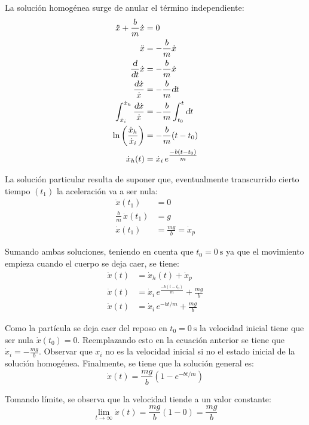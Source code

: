 \documentclass[a5paper,12pt,twoside]{book}
\begin{document}
La solución homogénea surge de anular el término independiente:
\begin{align*}
    \ddot{x} + \frac{b}{m} \dot{x} &= 0
    \\
    \ddot{x} &= - \frac{b}{m} \dot{x}
    \\
    \frac{\textsl{d}}{\textsl{d} t} \dot{x} &= - \frac{b}{m} \dot{x}
    \\
    \frac{\textsl{d} \dot{x}}{\dot{x}} &= - \frac{b}{m} \textsl{d} t
    \\
    \int_{\dot{x}_i}^{\dot{x}_h} \frac{\textsl{d} \dot{x}}{\dot{x}} &= - \frac{b}{m} \int_{t_0}^t \textsl{d} t
    \\
    \ln{ \left( \frac{\dot{x}_h}{\dot{x}_i} \right) } &= - \frac{b}{m} (t-t_0)
    \\
    \dot{x}_h(t) &= \dot{x}_i \, e^ {\tfrac{-b(t-t_0)}{m}}
\end{align*}

La solución particular resulta de suponer que, eventualmente transcurrido cierto tiempo $(t_1)$ la aceleración va a ser nula:
\begin{align*}
    \ddot{x}(t_1) &= 0
    \\
    \frac{b}{m} \, \dot{x}(t_1) &= g
    \\
    \dot{x}(t_1) &= \frac{mg}{b} = \dot{x}_p
\end{align*}

Sumando ambas soluciones, teniendo en cuenta que $t_0 = \SI{0}{\second}$ ya que el movimiento empieza cuando el cuerpo se deja caer, se tiene:
\begin{align*}
    \dot{x}(t) &= \dot{x}_h(t) + \dot{x}_p
    \\
    \dot{x}(t) &= \dot{x}_i \, e^ {\tfrac{-b(t-t_0)}{m}} + \frac{mg}{b}
    \\
    \dot{x}(t) &= \dot{x}_i \, e^ {-bt/m} + \frac{mg}{b}
\end{align*}

Como la partícula se deja caer del reposo en $t_0 = \SI{0}{\second}$ la velocidad inicial tiene que ser nula $\dot{x}(t_0) = 0$.
Reemplazando esto en la ecuación anterior se tiene que $\dot{x}_i = -\frac{mg}{b}$.
Observar que $x_i$ no es la velocidad inicial si no el estado inicial de la solución homogénea.
Finalmente, se tiene que la solución general es:
\[ \dot{x}(t) = \frac{mg}{b} \left( 1-e^{-bt/m} \right) \]

Tomando límite, se observa que la velocidad tiende a un valor constante:
\[ \lim_{t \to \infty} \dot{x}(t) = \frac{mg}{b} (1-0) = \frac{mg}{b} \]
\end{document}
